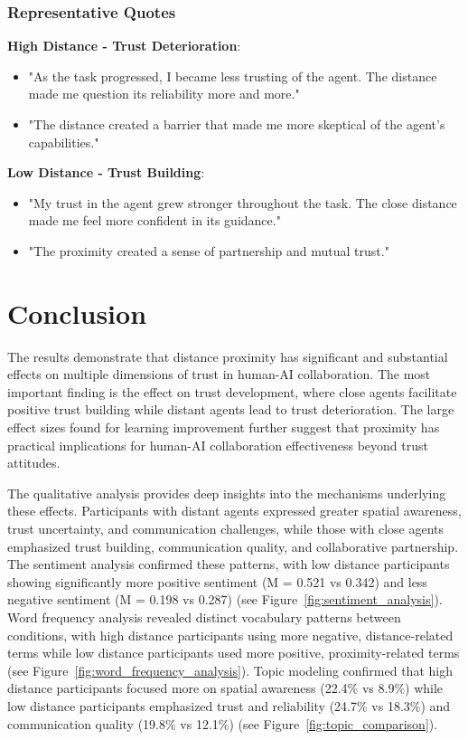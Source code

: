 \documentclass[12pt]{article}
\begin{document}
\subsubsection{Representative Quotes}

\textbf{High Distance - Trust Deterioration}:
\begin{itemize}
    \item "As the task progressed, I became less trusting of the agent. The distance made me question its reliability more and more."
    \item "The distance created a barrier that made me more skeptical of the agent's capabilities."
\end{itemize}

\textbf{Low Distance - Trust Building}:
\begin{itemize}
    \item "My trust in the agent grew stronger throughout the task. The close distance made me feel more confident in its guidance."
    \item "The proximity created a sense of partnership and mutual trust."
\end{itemize}

\section{Conclusion}

The results demonstrate that distance proximity has significant and substantial effects on multiple dimensions of trust in human-AI collaboration. The most important finding is the effect on trust development, where close agents facilitate positive trust building while distant agents lead to trust deterioration. The large effect sizes found for learning improvement further suggest that proximity has practical implications for human-AI collaboration effectiveness beyond trust attitudes.

The qualitative analysis provides deep insights into the mechanisms underlying these effects. Participants with distant agents expressed greater spatial awareness, trust uncertainty, and communication challenges, while those with close agents emphasized trust building, communication quality, and collaborative partnership. The sentiment analysis confirmed these patterns, with low distance participants showing significantly more positive sentiment (M = 0.521 vs 0.342) and less negative sentiment (M = 0.198 vs 0.287) (see Figure~\ref{fig:sentiment_analysis}). Word frequency analysis revealed distinct vocabulary patterns between conditions, with high distance participants using more negative, distance-related terms while low distance participants used more positive, proximity-related terms (see Figure~\ref{fig:word_frequency_analysis}). Topic modeling confirmed that high distance participants focused more on spatial awareness (22.4\% vs 8.9\%) while low distance participants emphasized trust and reliability (24.7\% vs 18.3\%) and communication quality (19.8\% vs 12.1\%) (see Figure~\ref{fig:topic_comparison}).
\end{document}
